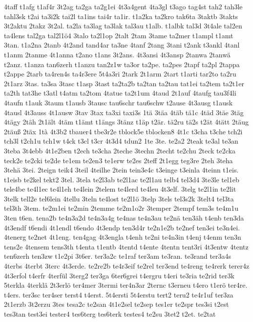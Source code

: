 {4taff
t1afg
t1af4r
3t2ag
ta2ga
ta2g1ei
4t3a4gent
4ta3gl
t3ago
tag4st
tah2
tah3le
tahl3sk
t2ai
ta3i2k
tai2l
ta1ins
tai4r
ta1ir.
t1a2ka
ta2kro
tak6ta
3taktb
3takts
3t2aktu
2takz
3t2al.
ta2la
ta3lag
ta3lak
tal3au
t1alb.
t1albk
tal3d
3t4ale
tal2en
ta4lens
tal2ga
tal2l1ö4
3talo
ta2l1op
2talt
2tam
3tame
ta2mer
t1ampl
t1amt
3tan.
t1a2na
2tanb
4t2and
tand4ar
ta3ne
4tanf
2tang
3tani
t2ank
t3ankl
4tanl
t1anm
2tanme
4t1anna
t2ano
t1ans
3t2ans.
4t3ansi
4t3ansp
2tanwa
2tanwä
t2anz.
t1anza
tan6zerh
t1anzu
tan2z1w
ta3or
ta2pe.
ta2pes
2tapf
ta2pl
2tappa
t2appe
2tarb
ta4ren4s
ta4r3ere
5t4a3ri
2tark
2t1arm
2tart
t1arti
tar2to
ta2ru
2t1arz
3tas.
ta3sa
3tasc
t1asp
3tast
ta2ta2b
ta2tan
ta2tau
tat1ei
ta2tem
ta2t1er
ta2th
tat3he
t3atl
t4atm
ta2tom
4tatue
ta2t1um
4taud
2t1auf
4taufg
tau3f4li
4taufn
t1auk
3taum
t1ausb
3tausc
tau6schr
tau6schw
t2ause
4t3ausg
t1ausk
4tausl
4t3auss
4t1ausw
3tav
3tax
ta3xi
taxi3s
1tä
3täa
4täb
tä1c
4täd
3täe
3täg
4tägy
2täh
2t1ält
4täm
t1ämt
t1ängs
3tänz
t1äp
t2är.
tä2ru
tä2s
t2ät
4tätt
2täug
2täuß
2täx
1tà
4t3b2
tbauer4
tbe3r2e
tblock5e
tblocken8
4t1c
t3cha
t3che
tch2i
tch3l
t2ch1u
tch1w
t4ck
t3cl
t3cr
4t3d4
tdun2
1te
3te.
te2a2
2teak
te3al
te3an
3teba
3t4ebb
4t1e2ben
t2ech
te3cha
2teche
3techn
2techt
te2chu
2teck
te2cka
teck2e
te2cki
te2de
te1em
te2en3
te1erw
te2es
2teff
2t1egg
teg3re
2teh
3teha
3tehä
3tei.
2teign
teik4
3teil
4teilhe
2tein
tein3e4c
t3einge
t3einla
4teinn
t1eis.
t1eisb
te2kel
tekt2
3tel.
3tela
te2l3ab
te2l1ac
te2l1au
telb4
tel3d4
3te3le
tel1eb
tele4be
te4l1ec
te4l1eh
te4lein
2telem
te4lerd
te4leu
4t3elf.
3telg
te2l1in
te2lit
3telk
tell2e
tel6lein
4tellu
3teln
te4lost
te2l1ö
3telp
3tels
tel3s2k
3telt4
tel3ta
tel3th
3tem.
te2m1ei
te2min
2temme
te2m1o2r
3temper
2tempf
tem3s
te4m1u
3ten
t6en.
tena2b
te4n3a2d
te4n3a4g
te4nas
te4n3au
te2nä
ten3äh
t4enb
ten3da
4t3endf
t6endi
4t1endl
t6endo
4t3endp
ten3d4r
te2n1e2b
te2nef
ten3ei
te3n4ei.
4tenerg
te2net
4t1eng.
ten4gag
4t3engla
t4enh
te2ni
te4n3in
t4enj
t4enm
ten3n
tens2e
4tensem
tens3th
t4enta
t1entb
4tentd
t4ente
4tentn
tent3ri
4t3entw
4tentz
ten6zerh
ten3zw
t1e2pi
3t6er.
ter3a2c
te1raf
ter3am
te3ran.
te3rand
ter3a4s
4terbs
4terbt
3terc
4t3erde.
te2re2b
te4r3eif
te2rel
ter3end
te4reng
te4rerk
terer4z
4t3erfol
t4erfr
4terfül
3terg2
ter3ga
6ter6grei
t4ergru
t4eri
te3ria
te2rid
ter3k
5terkla
4terklä
2t3erlö
ter4mer
3termi
ter4n3ar
2ternc
t3erneu
t4ero
t1erö
ter4re.
t4ers.
ter3sc
ter4ser
terst4
t4erst.
5t4ersti
5t4erstu
tert2
teru2
te4r1uf
ter3za
2t1erzb
3t2erzu
3tes
tesa2c
te2san
4t1e2sel
te2sep
tes1er
te2spr
tes3si
t2est
tes3tan
test3ei
tester4
tes6terg
tes6terk
testes4
te2su
3tet2
t2et.
te2tat
}
